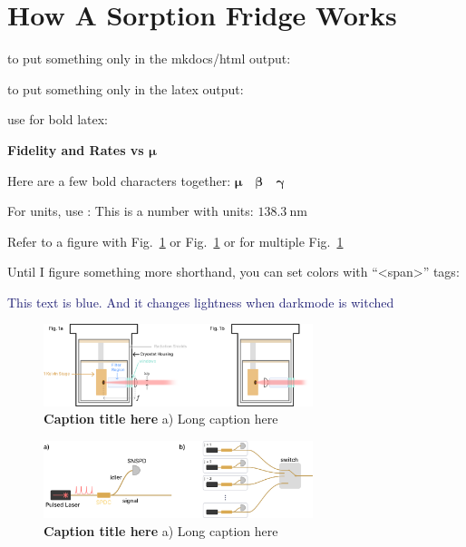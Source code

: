 \documentclass[11pt]{caltech_thesis} %
\begin{document}
\hypertarget{how-a-sorption-fridge-works}{%
\section{How A Sorption Fridge Works}\label{how-a-sorption-fridge-works}}

to put something only in the mkdocs/html output:

to put something only in the latex output:

use \boldsymbol for bold latex:

\textbf{Fidelity and Rates vs $\boldsymbol \mu$}

Here are a few bold characters together: $\boldsymbol{\mu \quad \beta \quad \gamma}$

For units, use :
This is a number with units: $138.3~\mathrm{nm}$

Refer to a figure with Fig.~\ref{fig:figurename} or Fig.~\ref{fig:figurename} or for multiple Fig.~\ref{fig:figurename}

Until I figure something more shorthand, you can set colors with ``\textless span\textgreater{}'' tags:

\textcolor{midnightblue}{ This text is blue. And it changes lightness when darkmode is witched }

\hypertarget{fig:figurename}{%
\begin{figure}
\centering
\includegraphics[width=0.7\textwidth,height=\textheight]{chapter_06/figs_06/fig1b_light.pdf}
\caption[{Figure label for in thesis index here.}]{\textbf{Caption title here} a) Long caption here}
\label{fig:figurename}
\end{figure}
}

\hypertarget{fig:figurename2}{%
\begin{figure}
\centering
\includegraphics[width=0.7\textwidth,height=\textheight]{chapter_06/figs_06/hsps_light.pdf}
\caption[{Figure label for in thesis index here.}]{\textbf{Caption title here} a) Long caption here}
\label{fig:figurename2}
\end{figure}
}
\end{document}
